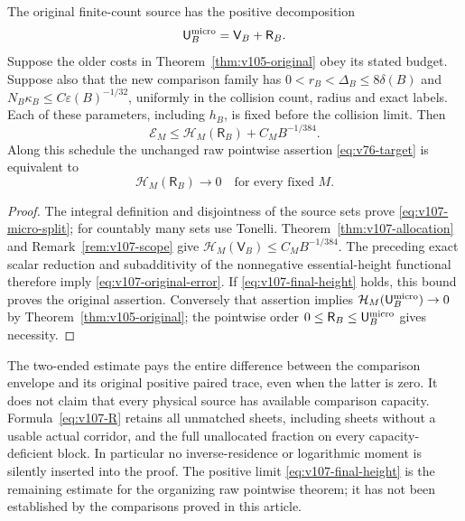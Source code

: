 \begin{theorem}
\label{thm:v107-original}
The original finite-count source has the positive decomposition
\begin{equation}\label{eq:v107-micro-split}
 \mathsf U_B^{\rm micro}=\mathsf V_B+\mathsf R_B.
\end{equation}
Suppose the older costs in Theorem~\ref{thm:v105-original} obey its
stated budget. Suppose also that the new comparison family has
$0<r_B<\Delta_B\le8\delta(B)$ and
$N_B\kappa_B\le C\varepsilon(B)^{-1/32}$, uniformly in the
collision count, radius and exact labels. Each of these parameters,
including $h_B$, is fixed before the collision limit. Then
\begin{equation}\label{eq:v107-original-error}
 \mathcal E_M\le\mathcal H_M(\mathsf R_B)+C_MB^{-1/384}.
\end{equation}
Along this schedule the unchanged raw pointwise assertion
\eqref{eq:v76-target} is equivalent to
\begin{equation}\label{eq:v107-final-height}
 \mathcal H_M(\mathsf R_B)\longrightarrow0
                         \quad\text{for every fixed }M.
\end{equation}
\end{theorem}
\begin{proof}
The integral definition and disjointness of the source sets prove
\eqref{eq:v107-micro-split}; for countably many sets use Tonelli.
Theorem~\ref{thm:v107-allocation} and
Remark~\ref{rem:v107-scope} give
$\mathcal H_M(\mathsf V_B)\le C_MB^{-1/384}$.
The preceding exact scalar reduction and subadditivity of the
nonnegative essential-height functional therefore imply
\eqref{eq:v107-original-error}. If \eqref{eq:v107-final-height}
holds, this bound proves the original assertion. Conversely that
assertion implies $\mathcal H_M(\mathsf U_B^{\rm micro})\to0$
by Theorem~\ref{thm:v105-original}; the pointwise order
$0\le\mathsf R_B\le\mathsf U_B^{\rm micro}$ gives necessity.
\end{proof}

The two-ended estimate pays the entire difference between the
comparison envelope and its original positive paired trace, even
when the latter is zero. It does not claim that every physical
source has available comparison capacity. Formula~\eqref{eq:v107-R}
retains all unmatched sheets, including sheets without a usable
actual corridor, and the full unallocated fraction on every
capacity-deficient block. In particular no inverse-residence or
logarithmic moment is silently inserted into the proof.
The positive limit \eqref{eq:v107-final-height} is the remaining
estimate for the organizing raw pointwise theorem; it has not been
established by the comparisons proved in this article.


